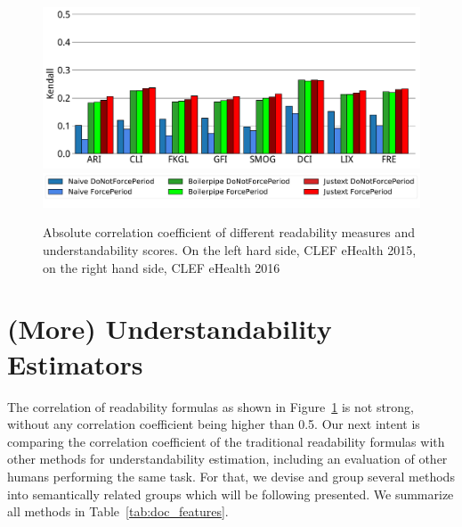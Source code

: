 \begin{figure}[th!]
   \includegraphics[width=.45\textwidth]{graphics/bar_corr_kendalltau16_values}
   \includegraphics[width=.8\textwidth]{graphics/legend62}
    \caption{Absolute correlation coefficient of different readability measures and understandability scores. On the left hard side, CLEF eHealth 2015, on the right hand side, CLEF eHealth 2016}
   \label{fig:bar_corr_clef15}
\end{figure}



\section{(More) Understandability Estimators}
\label{sec:proxies}

The correlation of readability formulas as shown in Figure~\ref{fig:bar_corr_clef15} %
is not strong, without any correlation coefficient being higher than 0.5.
Our next intent is comparing the correlation coefficient of the traditional readability formulas with other methods for understandability estimation, including an evaluation of other humans performing the same task.
For that, we devise and group several methods into semantically related groups which will be following presented.
We summarize all methods in Table~\ref{tab:doc_features}.


